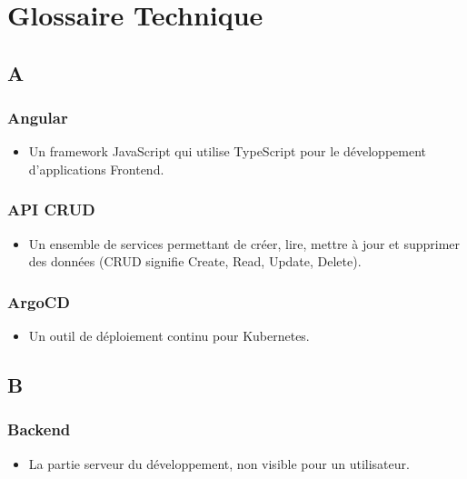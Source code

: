 \chapter*{Glossaire Technique}
\begin{multicols}{2}
    \section*{A}

    \subsection*{Angular}
    \begin{itemize}
        \item Un framework JavaScript qui utilise TypeScript pour le développement d'applications Frontend.
    \end{itemize}

    \subsection*{API CRUD}
    \begin{itemize}
        \item Un ensemble de services permettant de créer, lire, mettre à jour et supprimer des données (CRUD signifie Create, Read, Update, Delete).
    \end{itemize}

    \subsection*{ArgoCD}
    \begin{itemize}
        \item Un outil de déploiement continu pour Kubernetes.
    \end{itemize}

    \section*{B}

    \subsection*{Backend}
    \begin{itemize}
        \item La partie serveur du développement, non visible pour un utilisateur.
    \end{itemize}


\end{multicols}
